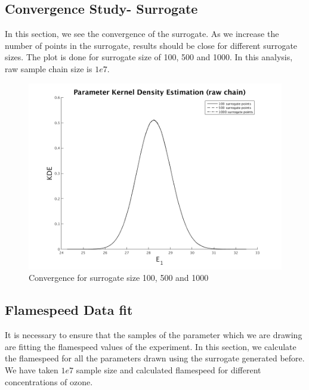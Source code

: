 \subsection{Convergence Study- Surrogate }

\noindent In this section, we see the convergence of the surrogate. As we increase the number of points in the surrogate, results should be close for different surrogate sizes. The plot is done for surrogate size of 100, 500 and 1000. In this analysis, raw sample chain size is $1e7$. 

\begin{figure}[H]
\centering
\includegraphics[scale=0.7]{model_1/conv_surrogate} 
    \caption{Convergence for surrogate size 100, 500 and 1000}
\end{figure}


\subsection{Flamespeed Data fit}

\noindent It is necessary to ensure that the samples of the parameter which we are drawing are fitting the flamespeed values of the experiment. In this section, we calculate the flamespeed for all the parameters drawn using the surrogate generated before. We have taken $1e7$ sample size and calculated flamespeed for different concentrations of ozone. 

